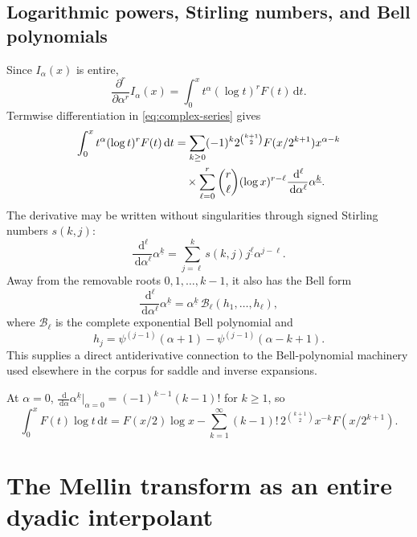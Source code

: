 \documentclass[11pt,oneside]{article}
\numberwithin{equation}{section}
\theoremstyle{definition}
\theoremstyle{remark}
\newcommand{\dd}{\,\mathrm d}
\newcommand{\fall}[2]{#1^{\underline{#2}}}
\begin{document}
\subsection{Logarithmic powers, Stirling numbers, and Bell polynomials}
Since $I_\alpha(x)$ is entire,
\begin{equation}
 \frac{\partial^r}{\partial\alpha^r}I_\alpha(x)
 =\int_0^xt^\alpha(\log t)^rF(t)\dd t.                    \label{eq:log-derivative}
\end{equation}
Termwise differentiation in \eqref{eq:complex-series} gives
\begin{align}
 \int_0^xt^\alpha(\log t)^rF(t)\dd t
 &=\sum_{k\ge0}(-1)^k2^{\binom{k+1}{2}}F(x/2^{k+1})x^{\alpha-k} \notag\\
 &\quad\times\sum_{\ell=0}^{r}\binom r\ell
 (\log x)^{r-\ell}\frac{\dd^\ell}{\dd\alpha^\ell}
 \fall{\alpha}{k}.                                       \label{eq:log-series}
\end{align}
The derivative may be written without singularities through signed Stirling
numbers $s(k,j)$:
\begin{equation}
 \frac{\dd^\ell}{\dd\alpha^\ell}\fall{\alpha}{k}
 =\sum_{j=\ell}^{k}s(k,j)\fall{j}{\ell}\alpha^{j-\ell}.  \label{eq:stirling-derivative}
\end{equation}
Away from the removable roots $0,1,\ldots,k-1$, it also has the Bell form
\begin{equation}
 \frac{\dd^\ell}{\dd\alpha^\ell}\fall{\alpha}{k}
 =\fall{\alpha}{k}\,
 \mathcal B_\ell(h_1,\ldots,h_\ell),                     \label{eq:bell-derivative}
\end{equation}
where $\mathcal B_\ell$ is the complete exponential Bell polynomial and
\begin{equation}
 h_j=\psi^{(j-1)}(\alpha+1)-\psi^{(j-1)}(\alpha-k+1).      \label{eq:bell-h}
\end{equation}
This supplies a direct antiderivative connection to the Bell-polynomial
machinery used elsewhere in the corpus for saddle and inverse expansions.

At $\alpha=0$, $\frac{\dd}{\dd\alpha}\fall{\alpha}{k}|_{\alpha=0}
=(-1)^{k-1}(k-1)!$ for $k\ge1$, so
\begin{equation}
 \boxed{
 \int_0^xF(t)\log t\dd t
 =F(x/2)\log x-
 \sum_{k=1}^{\infty}(k-1)!\,2^{\binom{k+1}{2}}
 x^{-k}F(x/2^{k+1}).}                                     \label{eq:log-explicit}
\end{equation}

\section{The Mellin transform as an entire dyadic interpolant}
\label{sec:mellin}
\end{document}
